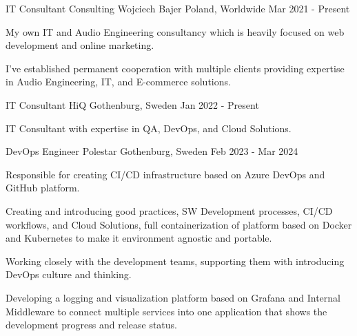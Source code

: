 
\begin{cventries}

  \cventry
  {IT Consultant} %
  {Consulting Wojciech Bajer} %
  {Poland, Worldwide} %
  {Mar 2021 - Present} %
  {
    \begin{cvitems} %
      \item {My own IT and Audio Engineering consultancy which is heavily focused on web development and online marketing.}
      \item {I've established permanent cooperation with multiple clients providing expertise in Audio Engineering, IT, and E-commerce solutions.}
    \end{cvitems}
  }

  \cventry
  {IT Consultant} %
  {HiQ} %
  {Gothenburg, Sweden} %
  {Jan 2022 - Present} %
  {
    \begin{cvitems}
      \item {IT Consultant with expertise in QA, DevOps, and Cloud Solutions.}
    \end{cvitems}
  }

  \cventry
  {DevOps Engineer} %
  {Polestar} %
  {Gothenburg, Sweden} %
  {Feb 2023 - Mar 2024} %
  {
    \begin{cvitems} %
      \item {Responsible for creating CI/CD infrastructure based on Azure DevOps and GitHub platform.}
      \item {Creating and introducing good practices, SW Development processes, CI/CD workflows, and Cloud Solutions, full containerization of platform based on Docker and Kubernetes to make it environment agnostic and portable.}
      \item {Working closely with the development teams, supporting them with introducing DevOps culture and thinking.}
      \item {Developing a logging and visualization platform based on Grafana and Internal Middleware to connect multiple services into one application that shows the development progress and release status.}
    \end{cvitems}
  }


\end{cventries}

